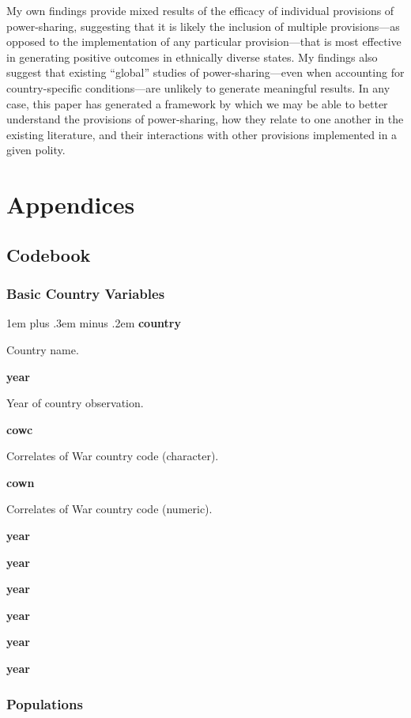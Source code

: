\documentclass[12pt]{article}
\begin{document}
My own findings provide mixed results of the efficacy of individual provisions of power-sharing, suggesting that it is likely the inclusion of multiple provisions—as opposed to the implementation of any particular provision—that is most effective in generating positive outcomes in ethnically diverse states. My findings also suggest that existing “global” studies of power-sharing—even when accounting for country-specific conditions—are unlikely to generate meaningful results. In any case, this paper has generated a framework by which we may be able to better understand the provisions of power-sharing, how they relate to one another in the existing literature, and their interactions with other provisions implemented in a given polity.

\pagebreak

\nocite{*}



\pagebreak

\section{Appendices}
\subsection{Codebook}

\newlength\cbl
\newenvironment{codebook}[1][rob\_avprison1]{
	\settowidth{\cbl}{#1}
	\parskip1em plus .3em minus .2em
	\parindent0pt
	\def\code##1##2{{\bfseries ##1}\hfill%
		\parbox[t]{\dimexpr\linewidth-15em-\cbl}{##2}\par}}{\noindent}

\subsubsection{Basic Country Variables}

\singlespacing
	
	\begin{codebook}
		\code{country}{Country name.}
		\code{year}{Year of country observation.}
		\code{cowc}{Correlates of War country code (character).}
		\code{cown}{Correlates of War country code (numeric).}
		\code{year}{}
		\code{year}{}
		\code{year}{}
		\code{year}{}
		\code{year}{}
		\code{year}{}
	\end{codebook}

\subsubsection{Populations}
\end{document}
